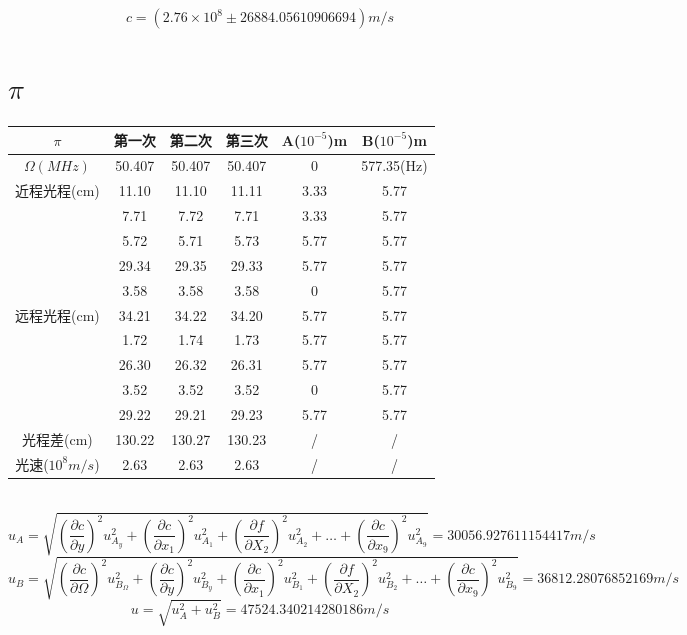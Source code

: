\documentclass[10pt, a4paper]{article}
\begin{document}
\begin{equation}
    c = (2.76\times10^{8} \pm 26884.05610906694)m/s
\end{equation}

\section{\(\pi\)}

\begin{tabular}{|c|c|c|c|c|c|}
		\hline
		\(\pi\) &第一次&第二次&第三次&A(\(10^{-5}\))m&B(\(10^{-5}\))m\\
        \hline
        \(\Omega(MHz)\)&50.407&50.407&50.407&0&577.35(Hz)\\
        \hline
        近程光程(cm)&11.10&11.10&11.11&3.33&5.77\\
        \hline
        \multirow{9}{*}{远程光程(cm)}&7.71&7.72&7.71&3.33&5.77\\
        \cline{2-6}
        &5.72&5.71&5.73&5.77&5.77\\
        \cline{2-6}
        &29.34&29.35&29.33&5.77&5.77\\
        \cline{2-6}
        &3.58&3.58&3.58&0&5.77\\
        \cline{2-6}
        &34.21&34.22&34.20&5.77&5.77\\
        \cline{2-6}
        &1.72&1.74&1.73&5.77&5.77\\
        \cline{2-6}
        &26.30&26.32&26.31&5.77&5.77\\
        \cline{2-6}
        &3.52&3.52&3.52&0&5.77\\
        \cline{2-6}
        &29.22&29.21&29.23&5.77&5.77\\
        \hline
        光程差(cm)&130.22 &130.27& 130.23&/&/\\
        \hline
        光速(\(10^{8}m/s\))&2.63& 2.63& 2.63&/&/\\
        \hline
\end{tabular}\\
\begin{equation}
    u_A = \sqrt{(\frac{\partial c}{\partial y})^2u_{A_y}^2+(\frac{\partial c}{\partial x_1})^2u_{A_1}^2+(\frac{\partial f}{\partial X_2})^2u_{A_2}^2+\ldots+(\frac{\partial c}{\partial x_9})^2u_{A_9}^2}= 30056.927611154417m/s
\end{equation}
\begin{equation}
    u_B = \sqrt{(\frac{\partial c}{\partial \Omega})^2u_{B_\Omega}^2+(\frac{\partial c}{\partial y})^2u_{B_y}^2+(\frac{\partial c}{\partial x_1})^2u_{B_1}^2+(\frac{\partial f}{\partial X_2})^2u_{B_2}^2+\ldots+(\frac{\partial c}{\partial x_9})^2u_{B_9}^2}= 36812.28076852169 m/s
\end{equation}
\begin{equation}
    u = \sqrt{u_A^2+u_B^2} = 47524.340214280186m/s
\end{equation}
\end{document}
